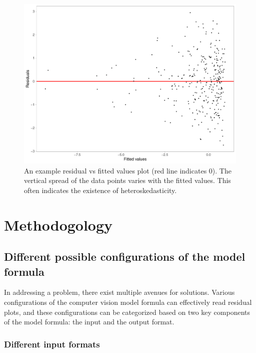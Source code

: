 \documentclass[]{interact}
\theoremstyle{plain}%
\theoremstyle{definition}
\theoremstyle{remark}
\begin{document}
\begin{figure}

{\centering \includegraphics[width=1\linewidth]{paper_files/figure-latex/false-finding-1} 

}

\caption{An example residual vs fitted values plot (red line indicates 0). The vertical spread of the data points varies with the fitted values. This often indicates the existence of heteroskedasticity.}\label{fig:false-finding}
\end{figure}

\hypertarget{methodogology}{%
\section{Methodogology}\label{methodogology}}

\hypertarget{different-possible-configurations-of-the-model-formula}{%
\subsection{Different possible configurations of the model
formula}\label{different-possible-configurations-of-the-model-formula}}

In addressing a problem, there exist multiple avenues for solutions.
Various configurations of the computer vision model formula can
effectively read residual plots, and these configurations can be
categorized based on two key components of the model formula: the input
and the output format.

\hypertarget{different-input-formats}{%
\subsubsection{Different input formats}\label{different-input-formats}}
\end{document}

